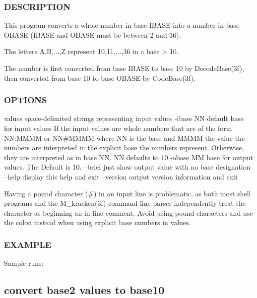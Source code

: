 \subsubsection*{D\+E\+S\+C\+R\+I\+P\+T\+I\+ON}

\begin{DoxyVerb}This program converts a whole number in base IBASE into a number in base OBASE
(IBASE and OBASE must be between 2 and 36).

The letters A,B,...,Z represent 10,11,...,36 in a base > 10.

The number is first converted from base IBASE to base 10 by DecodeBase(3f),
then converted from base 10 to base OBASE by CodeBase(3f).
\end{DoxyVerb}


\subsubsection*{O\+P\+T\+I\+O\+NS}

\begin{DoxyVerb} values     space-delimited strings representing input values
 -ibase NN  default base for input values
            If the input values are whole numbers that are of the
            form NN:MMMM or NN#MMMM where NN is the base and MMMM the
            value the numbers are interpreted in the explicit base
            the numbers represent. Otherwise, they are interpreted
            as in base NN. NN defaults to 10
 -obase MM  base for output values. The Default is 10.
 --brief    just show output value with no base designation
 --help     display this help and exit
 --version  output version information and exit

 Having a pound character (#) in an input line is problematic,
 as both most shell programs and the M_kracken(3f) command line
 parser independently treat the character as beginning an in-line
 comment. Avoid using pound characters and use the colon instead when
 using explicit base numbers in values.
\end{DoxyVerb}


\subsubsection*{E\+X\+A\+M\+P\+LE}

Sample runs\+:

\subsection*{convert base2 values to base10}

